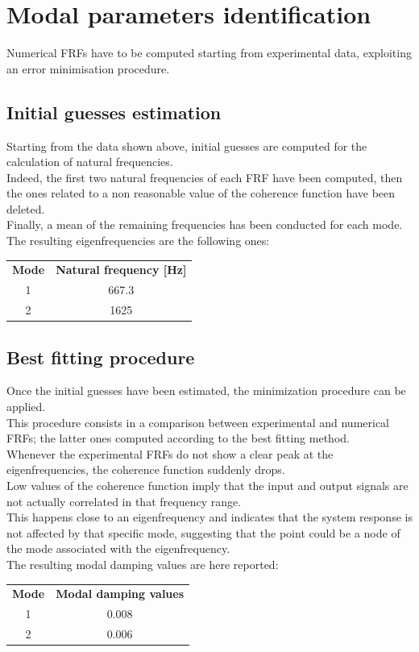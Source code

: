 \documentclass[12pt]{report}
\begin{document}
\section{Modal parameters identification}
Numerical FRFs have to be computed starting from experimental data, exploiting an error minimisation procedure.

\subsection{Initial guesses estimation}
Starting from the data shown above, initial guesses are computed for the calculation of natural frequencies.\\
Indeed, the first two natural frequencies of each FRF have been computed, then the ones related to a non reasonable value of the coherence function have been deleted.\\
Finally, a mean of the remaining frequencies has been conducted for each mode. \\
The resulting eigenfrequencies are the following ones:\\
\begin{center}
    \begin{tabular}{c|c}
        \multicolumn{1}{c}{\textbf{Mode}} & \multicolumn{1}{c}{\textbf{Natural frequency [Hz]}}\\
        1 & 667.3 \\
        2 & 1625 \\
    \end{tabular}
\end{center}

\subsection{Best fitting procedure}
Once the initial guesses have been estimated, the minimization procedure can be applied. \\This procedure consists in a comparison between experimental and numerical FRFs; the latter ones computed according to the best fitting method.\\
Whenever the experimental FRFs do not show a clear peak at the eigenfrequencies, the coherence function suddenly drops.\\
Low values of the coherence function imply that the input and output signals are not actually correlated in that frequency range.\\
This happens close to an eigenfrequency and indicates that the system response is not affected by that specific mode, suggesting that the point could be a node of the mode associated with the eigenfrequency.\\
The resulting modal damping values are here reported:
\begin{center}
    \begin{tabular}{c|c}
        \multicolumn{1}{c}{\textbf{Mode}} & \multicolumn{1}{c}{\textbf{Modal damping values}}\\
        1 & 0.008 \\
        2 & 0.006 \\
    \end{tabular}
\end{center}
\end{document}
